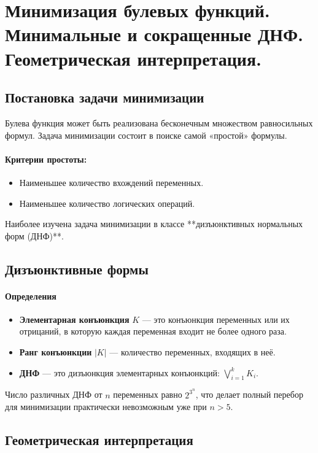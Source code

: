 \section{Минимизация булевых функций. Минимальные и сокращенные ДНФ. Геометрическая интерпретация.}

\subsection*{Постановка задачи минимизации}

Булева функция может быть реализована бесконечным множеством равносильных формул. Задача минимизации состоит в поиске самой «простой» формулы.
\paragraph{Критерии простоты:}
\begin{itemize}
    \item Наименьшее количество вхождений переменных.
    \item Наименьшее количество логических операций.
\end{itemize}
Наиболее изучена задача минимизации в классе **дизъюнктивных нормальных форм (ДНФ)**.

\subsection*{Дизъюнктивные формы}

\paragraph{Определения}
\begin{itemize}
    \item \textbf{Элементарная конъюнкция} $K$ — это конъюнкция переменных или их отрицаний, в которую каждая переменная входит не более одного раза.
    \item \textbf{Ранг конъюнкции} $|K|$ — количество переменных, входящих в неё.
    \item \textbf{ДНФ} — это дизъюнкция элементарных конъюнкций: $\bigvee_{i=1}^k K_i$.
\end{itemize}
Число различных ДНФ от $n$ переменных равно $2^{3^n}$, что делает полный перебор для минимизации практически невозможным уже при $n > 5$.

\subsection*{Геометрическая интерпретация}

